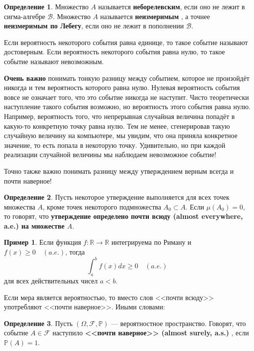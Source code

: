 \documentclass[pdftex, 12pt, a4paper]{article}
\def \mbb{\mathbb}
\def \PP{\mbb{P}}
\def\R{\ensuremath{\mathbb{R}}} %
\def\F{\ensuremath{\mathcal{F}}} %
\def \Om{\Omega}
\renewcommand{\to}{\rightarrow}
\renewcommand{\ge}{\geqslant}
\theoremstyle{definition} %
\newtheorem*{mydef}{Определение}
\newtheorem{myex}{Пример}
\numberwithin{problem}{section}
\newcommand{\indef}[1]{\textbf{#1}}
\numberwithin{blits}{section}
\begin{document}
\begin{mydef}
Множество $A$ называется \indef{неборелевским},  если оно не лежит в сигма-алгебре $\mathcal{B}$. Множество $A$ называется \indef{неизмеримым }, а точнее \indef{неизмеримым по Лебегу}, если оно не лежит в пополнении  $\mathcal{B}$. 
\end{mydef}







Если вероятность некоторого события равна единице, то такое событие называют достоверным. Если вероятность некоторого события равна нулю, то такое событие называют невозможным. 

\textbf{Очень важно} понимать тонкую разницу между событием, которое не произойдёт никогда и тем вероятность которого равна нулю.  Нулевая вероятность события вовсе не означает того, что это событие никогда не наступит. Чисто теоретически наступление такого события возможно, но вероятность этого события равна нулю. Например, вероятность того, что непрерывная случайная величина попадёт в какую-то конкретную точку равна нулю. Тем не менее, сгенерировав такую случайную величину на компьютере, мы увидим, что она приняла конкретное значение, то есть попала в некоторую точку. Удивительно, но при каждой реализации случайной величины мы наблюдаем невозможное событие! 

Точно также важно понимать разницу между утверждением верным всегда и почти наверное!

\begin{mydef}
Пусть некоторое утверждение выполняется для всех точек множества $A$, кроме точек некоторого подмножества $A_0 \subset A$. Если $\mu(A_0)=0$, то говорят, что \indef{утверждение определено почти всюду (almost everywhere, a.e.) на множестве $A$}.   
\end{mydef}

\begin{myex}
Если функция $f \colon \R \to \R$ интегрируема по Риману и $f(x) \ge 0 \quad (a.e.)$, тогда \[\displaystyle \int_{a}^{b} f(x) dx \ge 0 \quad (a.e.)\] для всех действительных чисел $a < b$.
\end{myex}

Если мера является вероятностью, то вместо слов  <<почти всюду>> употребляют <<почти наверное>>. Иными словами:

\begin{mydef}
Пусть $(\Om, \F, \PP)$ --- вероятностное пространство. Говорят, что событие $A \in \F$ наступило \indef{<<почти наверное>> (almost surely, a.s.)}  , если $\PP(A) = 1$.
\end{mydef}
\end{document}
